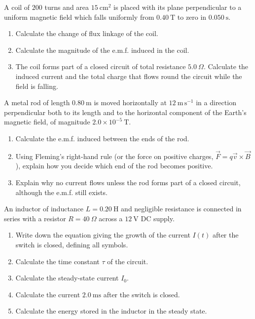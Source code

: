 \documentclass[11pt]{article}
\newcounter{popsec}
\newcounter{popsub}
\newcommand{\courssub}[1]{%
  \stepcounter{popsub}%
  \par\vspace{9pt}\noindent{\popxbold\fontsize{11.5}{13}\selectfont\color{popink}{\color{poporange}\thepopsec.\thepopsub}\hspace{6pt}#1}\par\nopagebreak\vspace{4pt}
}
\begin{document}
\courssub{I practise}

\begin{exercice}
A coil of $200$ turns and area $15\ \mathrm{cm^2}$ is placed with its plane perpendicular to a uniform magnetic field which falls uniformly from $0.40\ \mathrm{T}$ to zero in $0.050\ \mathrm{s}$.
\begin{enumerate}
\item Calculate the change of flux linkage of the coil.
\item Calculate the magnitude of the e.m.f. induced in the coil.
\item The coil forms part of a closed circuit of total resistance $5.0\ \Omega$. Calculate the induced current and the total charge that flows round the circuit while the field is falling.
\end{enumerate}
\end{exercice}

\begin{exercice}
A metal rod of length $0.80\ \mathrm{m}$ is moved horizontally at $12\ \mathrm{m\,s^{-1}}$ in a direction perpendicular both to its length and to the horizontal component of the Earth's magnetic field, of magnitude $2.0\times10^{-5}\ \mathrm{T}$.
\begin{enumerate}
\item Calculate the e.m.f. induced between the ends of the rod.
\item Using Fleming's right-hand rule (or the force on positive charges, $\vec{F}=q\vec{v}\times\vec{B}$), explain how you decide which end of the rod becomes positive.
\item Explain why no current flows unless the rod forms part of a closed circuit, although the e.m.f. still exists.
\end{enumerate}
\end{exercice}

\begin{exercice}
An inductor of inductance $L = 0.20\ \mathrm{H}$ and negligible resistance is connected in series with a resistor $R = 40\ \Omega$ across a $12\ \mathrm{V}$ DC supply.
\begin{enumerate}
\item Write down the equation giving the growth of the current $I(t)$ after the switch is closed, defining all symbols.
\item Calculate the time constant $\tau$ of the circuit.
\item Calculate the steady-state current $I_0$.
\item Calculate the current $2.0\ \mathrm{ms}$ after the switch is closed.
\item Calculate the energy stored in the inductor in the steady state.
\end{enumerate}
\end{exercice}
\end{document}
